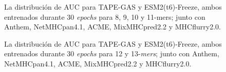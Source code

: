 \begin{figure}[H]
	
		
	\caption{
		La distribución de AUC para TAPE-GAS y ESM2(t6)-Freeze, ambos entrenados durante 30 \textit{epochs} para 8, 9, 10 y 11-mers; junto con Anthem, NetMHCpan4.1, ACME, MixMHCpred2.2 y MHCflurry2.0.}
	\label{fig:auc_distribution}
\end{figure}

\begin{figure}[H]
	\centering	

	
	\caption{
		La distribución de AUC para TAPE-GAS y ESM2(t6)-Freeze, ambos entrenados durante 30 \textit{epochs} para 12 y 13-\textit{mers}; junto con Anthem, NetMHCpan4.1, ACME, MixMHCpred2.2 y MHCflurry2.0.}
	\label{fig:auc_distribution2}
\end{figure}



